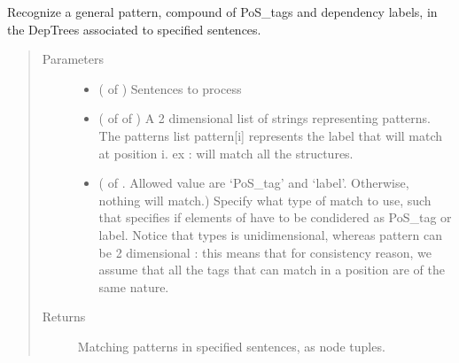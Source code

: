 \documentclass[letterpaper,10pt,english]{sphinxmanual}
\begin{document}

\begin{fulllineitems}
\label{\detokenize{analysis:loacore.analysis.pattern_recognition.general_pattern_recognition}}
Recognize a general pattern, compound of PoS\_tags and dependency labels, in the DepTrees associated to specified
sentences.
\begin{quote}\begin{description}
\item[{Parameters}] \leavevmode\begin{itemize}
\item {} 
 ( of {\hyperref[\detokenize{classes:loacore.classes.classes.Sentence}]{}}) \textendash{} Sentences to process

\item {} 
 ( of  of ) \textendash{} A 2 dimensional list of strings representing patterns. The patterns list pattern{[}i{]} represents the label
that will match at position i. ex :  will match all the
 structures.

\item {} 
 ( of . Allowed value are ‘PoS\_tag’ and ‘label’. Otherwise, nothing will
match.) \textendash{} Specify what type of match to use, such that  specifies if elements of  have to be
condidered as PoS\_tag or label. Notice that types is unidimensional, whereas pattern can be 2 dimensional :
this means that for consistency reason, we assume that all the tags that can match in a position  are of
the same nature.

\end{itemize}

\item[{Returns}] \leavevmode
Matching patterns in specified sentences, as node tuples.


\end{description}
\end{quote}
\end{fulllineitems}
\end{document}
